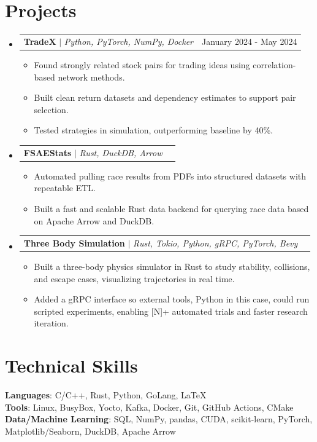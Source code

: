 \documentclass[letterpaper,11pt]{article}
\makeatletter
\newcommand{\resumeItem}[1]{
  \item\small{
    {#1 \vspace{-2pt}}
  }
}
\newcommand{\resumeProjectHeading}[2]{
    \item
    \begin{tabular*}{0.97\textwidth}{l@{\extracolsep{\fill}}r}
      \small#1 & #2 \\
    \end{tabular*}\vspace{-7pt}
}
\newcommand{\resumeSubHeadingListStart}{\begin{itemize}[leftmargin=0.15in, label={}]}
\newcommand{\resumeSubHeadingListEnd}{\end{itemize}}
\newcommand{\resumeItemListStart}{\begin{itemize}}
\newcommand{\resumeItemListEnd}{\end{itemize}\vspace{-5pt}}
\makeatother
\begin{document}
\section{Projects}
    \resumeSubHeadingListStart
      \resumeProjectHeading
      {\textbf{TradeX} $|$ \emph{Python, PyTorch, NumPy, Docker}}{January 2024 - May 2024}
          \resumeItemListStart
          \resumeItem{Found strongly related stock pairs for trading ideas using correlation-based network methods.}
          \resumeItem{Built clean return datasets and dependency estimates to support pair selection.}
          \resumeItem{Tested strategies in simulation, outperforming baseline by 40\%.}
          \resumeItemListEnd
      \resumeProjectHeading
          {\textbf{FSAEStats} $|$ \emph{Rust, DuckDB, Arrow}}{}
          \resumeItemListStart
          \resumeItem{Automated pulling race results from PDFs into structured datasets with repeatable ETL.}
          \resumeItem{Built a fast and scalable Rust data backend for querying race data based on Apache Arrow and DuckDB.}
          \resumeItemListEnd
                \resumeProjectHeading
          {\textbf{Three Body Simulation} $|$ \emph{Rust, Tokio, Python, gRPC, PyTorch, Bevy}}{}
          \resumeItemListStart
          \resumeItem{Built a three-body physics simulator in Rust to study stability, collisions, and escape cases, visualizing trajectories in real time.}
\resumeItem{Added a gRPC interface so external tools, Python in this case, could run scripted experiments, enabling [N]+ automated trials and faster research iteration.}

          \resumeItemListEnd

    \resumeSubHeadingListEnd
%
\section{Technical Skills}
 \begin{itemize}[leftmargin=0.15in, label={}]
    \small{\item{
     \textbf{Languages}{: C/C++, Rust, Python, GoLang, \LaTeX} \\
     \textbf{Tools}{: Linux, BusyBox, Yocto, Kafka, Docker, Git, GitHub Actions, CMake} \\
     \textbf{Data/Machine Learning}{: SQL, NumPy, pandas, CUDA, scikit-learn, PyTorch, Matplotlib/Seaborn, DuckDB, Apache Arrow}
    }}
 \end{itemize}

\end{document}
